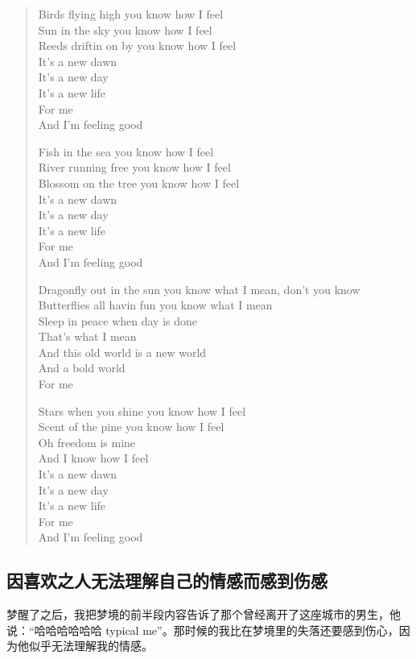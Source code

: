 \blockquote{
	Birds flying high you know how I feel\\
	Sun in the sky you know how I feel\\
	Reeds driftin on by you know how I feel\\
	It's a new dawn\\
	It's a new day\\
	It's a new life\\
	For me\\
	And I'm feeling good

	Fish in the sea you know how I feel\\
	River running free you know how I feel\\
	Blossom on the tree you know how I feel\\
	It's a new dawn\\
	It's a new day\\
	It's a new life\\
	For me\\
	And I'm feeling good

	Dragonfly out in the sun you know what I mean, don't you know\\
	Butterflies all havin fun you know what I mean\\
	Sleep in peace when day is done\\
	That's what I mean\\
	And this old world is a new world\\
	And a bold world\\
	For me

	Stars when you shine you know how I feel\\
	Scent of the pine you know how I feel\\
	Oh freedom is mine \\
	And I know how I feel\\
	It's a new dawn\\
	It's a new day\\
	It's a new life\\
	For me\\
	And I'm feeling good
}




\subsection*{因喜欢之人无法理解自己的情感而感到伤感}

梦醒了之后，我把梦境的前半段内容告诉了那个曾经离开了这座城市的男生，他说：“哈哈哈哈哈哈 typical me”。那时候的我比在梦境里的失落还要感到伤心，因为他似乎无法理解我的情感。

